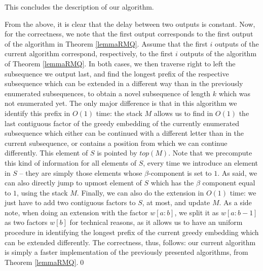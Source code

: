 \documentclass[10pt,a4paper]{amsart}
\makeatletter
\theoremstyle{plain}
\theoremstyle{definition}
\renewenvironment{proof}[1][\proofname]{\par
  \pushQED{}%
  \normalfont \topsep6\p@\@plus6\p@\relax
  \trivlist
  \item[\hskip\labelsep\itshape #1\@addpunct{.}]\ignorespaces
}{%
  \popQED\endtrivlist\@endpefalse
}
\makeatother
\begin{document}
\begin{proof}
This concludes the description of our algorithm. 

From the above, it is clear that the delay between two outputs is constant. Now, for the correctness, we note that the first output corresponds to the first output of the algorithm in Theorem \ref{lemmaRMQ}. Assume that the first $i$ outputs of the current algorithm correspond, respectively, to the first $i$ outputs of the algorithm of Theorem \ref{lemmaRMQ}. In both cases, we then traverse right to left the subsequence we output last, and find the longest prefix of the respective subsequence which can be extended in a different way than in the previously enumerated subsequences, to obtain a novel subsequence of length $k$ which was not enumerated yet. The only major difference is that in this algorithm we identify this prefix in $O(1)$ time: the stack $M$ allows us to find in $O(1)$ the last contiguous factor of the greedy embedding of the currently enumerated subsequence which either can be continued with a different letter than in the current subsequence, or contains a position from which we can continue differently. This element of $S$ is pointed by $top(M)$. Note that we precompute this kind of information for all elements of $S$, every time we introduce an element in $S$ -- they are simply those elements whose $\beta$-component is set to $1$. As said, we can also directly jump to upmost element of $S$ which has the $\beta$ component equal to $1$, using the stack $M$. Finally, we can also do the extension in $O(1)$ time: we just have to add two contiguous factors to $S$, at most, and update $M$. As a side note, when doing an extension with the factor $w[a:b]$, we split it as $w[a:b-1]$ as two factors $w[b]$ for technical reasons, as it allows us to have an uniform procedure in identifying the longest prefix of the current greedy embedding which can be extended differently. The correctness, thus, follows: our current algorithm is simply a faster implementation of the previously presented algorithms, from Theorem \ref{lemmaRMQ}.\qed
 \end{proof}
\end{document}
